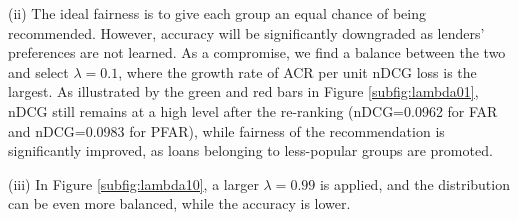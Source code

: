 (ii) The ideal fairness is to give each group an equal chance of being recommended. However, accuracy will be significantly downgraded as lenders' preferences are not learned. As a compromise, we find a balance between the two and select $\lambda=0.1$, where the growth rate of ACR per unit nDCG loss is the largest. As illustrated by the green and red bars in Figure \ref{subfig:lambda01}, nDCG still remains at a high level after the re-ranking (nDCG=0.0962 for FAR and nDCG=0.0983 for PFAR), while fairness of the recommendation is significantly improved, as loans belonging to less-popular groups are promoted.

(iii) In Figure \ref{subfig:lambda10}, a larger $\lambda=0.99$ is applied, and the distribution can be even more balanced, while the accuracy is lower.





